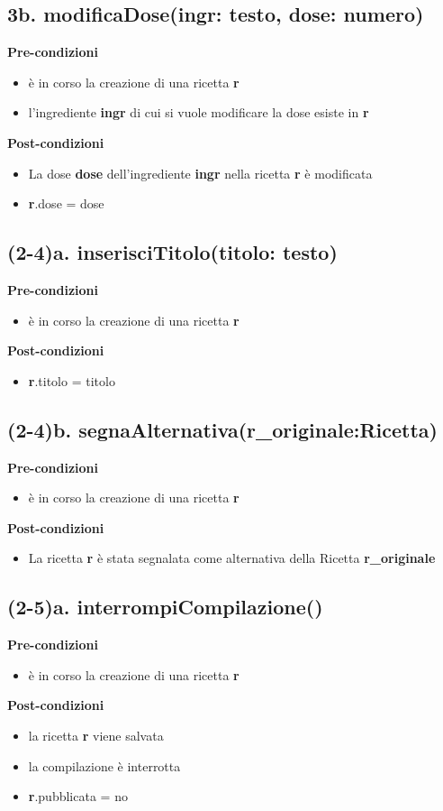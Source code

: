 \documentclass[12pt]{extarticle}
\begin{document}
\subsection*{3b. modificaDose(ingr: testo, dose: numero)}

\textbf{Pre-condizioni}
\begin{itemize}
  \item è in corso la creazione di una ricetta  \textbf{r}
  \item l'ingrediente \textbf{ingr} di cui si vuole modificare la dose esiste in \textbf{r}
\end{itemize}
\textbf{Post-condizioni}
\begin{itemize}
  \item La dose \textbf{dose} dell'ingrediente \textbf{ingr} nella ricetta \textbf{r} è modificata
  \item \textbf{r}.dose = dose
\end{itemize}

\subsection*{(2-4)a. inserisciTitolo(titolo: testo)}

\textbf{Pre-condizioni}
\begin{itemize}
  \item è in corso la creazione di una ricetta  \textbf{r}
\end{itemize}
\textbf{Post-condizioni}
\begin{itemize}
  \item \textbf{r}.titolo = titolo
\end{itemize}

\subsection*{(2-4)b. segnaAlternativa(r\_originale:Ricetta)}

\textbf{Pre-condizioni}
\begin{itemize}
  \item è in corso la creazione di una ricetta  \textbf{r}
\end{itemize}
\textbf{Post-condizioni}
\begin{itemize}
  \item La ricetta  \textbf{r} è stata segnalata come alternativa della Ricetta  \textbf{r\_originale}
\end{itemize}

\subsection*{(2-5)a. interrompiCompilazione()}

\textbf{Pre-condizioni}
\begin{itemize}
  \item è in corso la creazione di una ricetta  \textbf{r}
\end{itemize}
\textbf{Post-condizioni}
\begin{itemize}
  \item la ricetta  \textbf{r} viene salvata
  \item la compilazione è interrotta
  \item \textbf{r}.pubblicata = no
\end{itemize}
\end{document}
